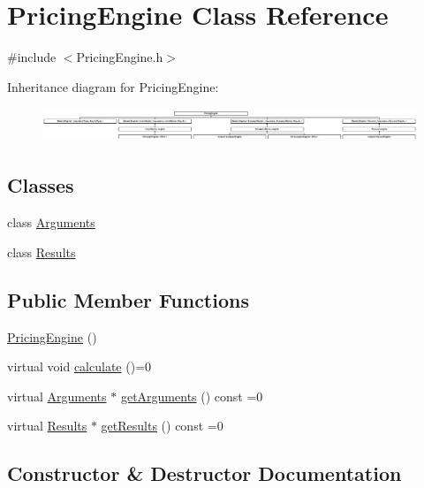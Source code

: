 \hypertarget{class_pricing_engine}{}\section{Pricing\+Engine Class Reference}
\label{class_pricing_engine}


{\ttfamily \#include $<$Pricing\+Engine.\+h$>$}

Inheritance diagram for Pricing\+Engine\+:\begin{figure}[H]
\begin{center}
\leavevmode
\includegraphics[height=1.034642cm]{class_pricing_engine}
\end{center}
\end{figure}
\subsection*{Classes}
\begin{DoxyCompactItemize}
\item 
class \hyperlink{class_pricing_engine_1_1_arguments}{Arguments}
\item 
class \hyperlink{class_pricing_engine_1_1_results}{Results}
\end{DoxyCompactItemize}
\subsection*{Public Member Functions}
\begin{DoxyCompactItemize}
\item 
\hyperlink{class_pricing_engine_abfd32778b0483e92db2e7cd00a2f9345}{Pricing\+Engine} ()
\item 
virtual void \hyperlink{class_pricing_engine_a733511ffc3cf5e4dc1fbc2a39208d8bd}{calculate} ()=0
\item 
virtual \hyperlink{class_pricing_engine_1_1_arguments}{Arguments} $\ast$ \hyperlink{class_pricing_engine_a399f4519f58b2ac1d108ce14d0058c97}{get\+Arguments} () const =0
\item 
virtual \hyperlink{class_pricing_engine_1_1_results}{Results} $\ast$ \hyperlink{class_pricing_engine_a73e2852ef4c28e92a402492e86717d0b}{get\+Results} () const =0
\end{DoxyCompactItemize}


\subsection{Constructor \& Destructor Documentation}
\hypertarget{class_pricing_engine_abfd32778b0483e92db2e7cd00a2f9345}{}\label{class_pricing_engine_abfd32778b0483e92db2e7cd00a2f9345} 
